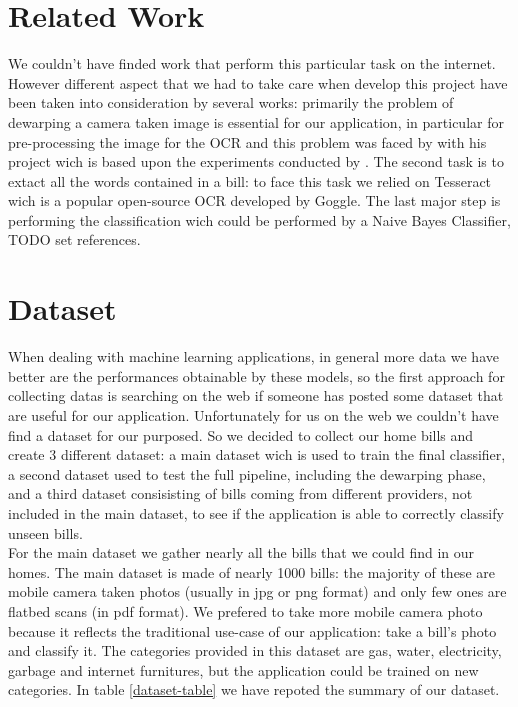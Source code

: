 \documentclass[10pt,twocolumn,letterpaper]{article}
\begin{document}
\section{Related Work}
We couldn't have finded work that perform this particular task on the internet. However different aspect that we had to take care when develop this project have been taken into consideration by several works: primarily the problem of dewarping a camera taken image is essential for our application, in particular for pre-processing the image for the OCR and this problem was faced by \cite{Improvingcamera-based} with his project \cite{mobile-ocr} wich is based upon the experiments conducted by \cite{recoveringhomography}. The second task is to extact all the words contained in a bill: to face this task we relied on Tesseract \cite{Tesseract} wich is a popular open-source OCR developed by Goggle. The last major step is performing the classification wich could be performed by a Naive Bayes Classifier, TODO set references. 

\section{Dataset}
When dealing with machine learning applications, in general more data we have  better are the performances obtainable by these models, so the first approach for collecting datas is searching on the web if someone has posted some dataset that are useful for our application. Unfortunately for us on the web we couldn't have find a dataset for our purposed. So we decided to collect our home bills and create 3 different dataset: a main dataset wich is used to train the final classifier, a second dataset used to test the full pipeline, including the dewarping phase, and a third dataset consisisting of bills coming from different providers, not included in the main dataset, to see if the application is able to correctly classify unseen bills.\\

For the main dataset we gather nearly all the bills that we could find in our homes. The main dataset is made of nearly 1000 bills: the majority of these are mobile camera taken photos (usually in jpg or png format) and only few ones are flatbed scans (in pdf format). We prefered to take more mobile camera photo because it reflects the traditional use-case of our application: take a bill's photo and classify it. The categories provided in this dataset are gas, water, electricity, garbage and internet furnitures, but the application could be trained on new categories. In table \ref{dataset-table} we have repoted the summary of our dataset.
\end{document}
